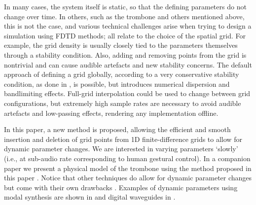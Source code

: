 In many cases, the system itself is static, so that the defining parameters do not change over time. In others, such as the trombone and others mentioned above, this is not the case, and various technical challenges arise when trying to design a simulation using FDTD methods; all relate to the choice of the spatial grid. For example, the grid density is usually closely tied to the parameters themselves through a stability condition.
Also, adding and removing points from the grid is nontrivial and can cause audible artefacts and new stability concerns. The default approach of defining a grid globally, according to a very conservative stability condition, as done in \cite{Willemsen2019}, is possible, but introduces numerical dispersion and bandlimiting effects. Full-grid interpolation \cite[Ch. 5]{bilbao2009} could be used to change between grid configurations, but extremely high sample rates are necessary to avoid audible artefacts and low-passing effects, rendering any implementation offline. 

In this paper, a new method is proposed, allowing the efficient and smooth insertion and deletion of grid points from 1D finite-difference grids to allow for dynamic parameter changes. We are interested in varying parameters `slowly' (i.e., at sub-audio rate corresponding to human gestural control). In a companion paper we present a physical model of the trombone using the method proposed in this paper \cite{Willemsen2021}. Notice that other techniques do allow for dynamic parameter changes but come with their own drawbacks \cite{bilbao2009}. Examples of dynamic parameters using modal synthesis \cite{morrison1993mosaic} are shown in \cite{Mehes2016, Willemsen2017} and digital waveguides \cite{Smith1992} in \cite{Michon2014}. 



